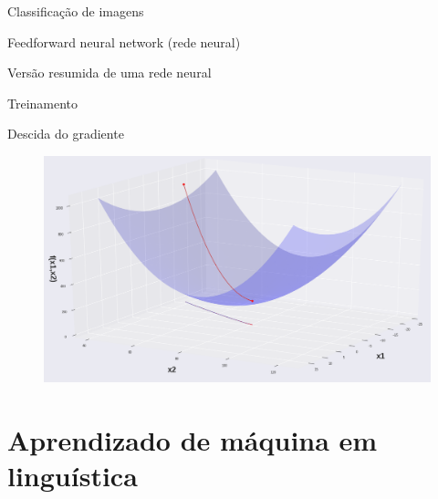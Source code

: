 \documentclass[10pt]{beamer}
\begin{document}
\begin{frame}[fragile]{Classificação de imagens}


\end{frame}

\begin{frame}[fragile]{Feedforward neural network  (rede neural)}

\end{frame}

\begin{frame}[fragile]{Versão resumida de uma rede neural}

\end{frame}

\begin{frame}{Treinamento}

\end{frame}


\begin{frame}[fragile]{Descida do gradiente}
\begin{figure}
\centering
\includegraphics[width=1.0\linewidth]{images/Minimization_image.png}
\end{figure}
\end{frame}

\section{Aprendizado de máquina em linguística}
\end{document}
